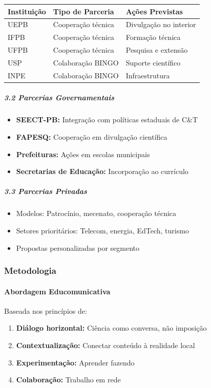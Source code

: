 \bigskip\noindent
\begin{tabular}{p{}p{}p{}}
\toprule
Instituição & Tipo de Parceria & Ações Previstas \\
\hline
UEPB & Cooperação técnica & Divulgação no interior \\
IFPB & Cooperação técnica & Formação técnica \\
UFPB & Cooperação técnica & Pesquisa e extensão \\
USP & Colaboração BINGO & Suporte científico \\
INPE & Colaboração BINGO & Infraestrutura \\
\bottomrule
\end{tabular}

\bigskip

\subparagraph{3.2 Parcerias Governamentais}

\begin{itemize}
\item \textbf{SEECT-PB:} Integração com políticas estaduais de C\&T
\item \textbf{FAPESQ:} Cooperação em divulgação científica
\item \textbf{Prefeituras:} Ações em escolas municipais
\item \textbf{Secretarias de Educação:} Incorporação ao currículo
\end{itemize}

\subparagraph{3.3 Parcerias Privadas}

\begin{itemize}
\item Modelos: Patrocínio, mecenato, cooperação técnica
\item Setores prioritários: Telecom, energia, EdTech, turismo
\item Propostas personalizadas por segmento
\end{itemize}

\subsubsection{Metodologia}

\paragraph{Abordagem Educomunicativa}

Baseada nos princípios de:

\begin{enumerate}
\item \textbf{Diálogo horizontal:} Ciência como conversa, não imposição
\item \textbf{Contextualização:} Conectar conteúdo à realidade local
\item \textbf{Experimentação:} Aprender fazendo
\item \textbf{Colaboração:} Trabalho em rede
\end{enumerate}

